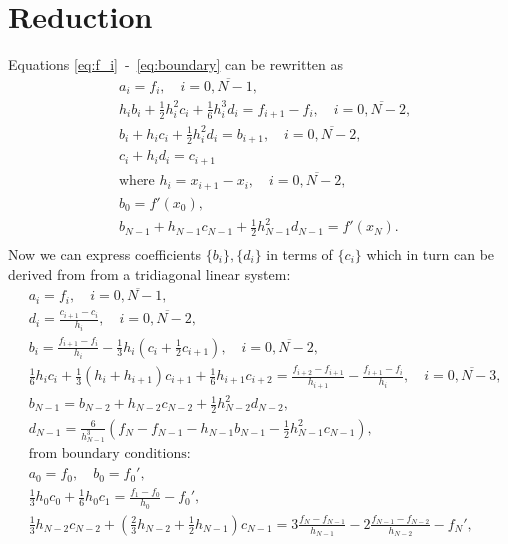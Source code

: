 \documentclass{article}
\begin{document}
\section{Reduction}
Equations \eqref{eq:f_i}~-~\eqref{eq:boundary} can be rewritten as
\begin{align*}
     & a_i = f_i, \quad i=\overline{0,N-1}, \\
     & h_i b_i + \frac12 h_i^2 c_i + \frac16 h_i^3 d_i = f_{i+1} - f_i, \quad i=\overline{0,N-2}, \\
     & b_i + h_i c_i + \frac12 h_i^2 d_i = b_{i+1}, \quad i=\overline{0,N-2}, \\
     & c_i + h_i d_i = c_{i+1} \\
     & \text{where } h_i = x_{i+1} - x_i, \quad i = \overline{0, N-2}, \\
     & b_0 = f'(x_0), \\
     & b_{N-1} + h_{N-1} c_{N-1} + \frac12 h_{N-1}^2 d_{N-1} = f'(x_N). \\
\end{align*}
Now we can express coefficients \( \{b_i\}, \{d_i\} \) in terms of \( \{c_i\} \)
which in turn can be derived from from a tridiagonal linear system:
\begin{align*}
    & a_i = f_i, \quad i=\overline{0,N-1}, \\
    & d_i = \frac{c_{i+1}-c_i}{h_i}, \quad i=\overline{0,N-2}, \\
    & b_i = \frac{f_{i+1}-f_i}{h_i} - \frac13h_i(c_i + \frac12 c_{i+1}), \quad i=\overline{0,N-2}, \\
    & \frac16 h_i c_i + \frac13 (h_i + h_{i+1}) c_{i+1} + \frac16 h_{i+1} c_{i+2} = \frac{f_{i+2}-f_{i+1}}{h_{i+1}} - \frac{f_{i+1}-f_i}{h_i},
        \quad i=\overline{0,N-3}, \\
    & b_{N-1} = b_{N-2} + h_{N-2} c_{N-2} + \frac12 h_{N-2}^2 d_{N-2}, \\
    & d_{N-1} = \frac{6}{h_{N-1}^3}(f_N - f_{N-1} - h_{N-1} b_{N-1} - \frac12 h_{N-1}^2 c_{N-1}), \\
    & \text{from boundary conditions:} \\
    & a_0 = f_0, \quad b_0 = f_0', \\
    & \frac13 h_0 c_0 + \frac16 h_0 c_1 = \frac{f_1 - f_0}{h_0} - f_0', \\
    & \frac13 h_{N-2} c_{N-2} + (\frac23 h_{N-2}  + \frac12 h_{N-1}) c_{N-1} =
        3\frac{f_N - f_{N-1}}{h_{N-1}} - 2 \frac{f_{N-1} - f_{N-2}}{h_{N-2}} - f_N' , \\
\end{align*}
\end{document}
